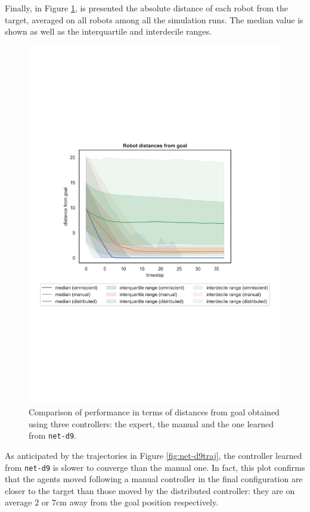 Finally, in Figure \ref{fig:net-d9distance}, is presented the absolute distance of 
each robot from the target, averaged on all robots among all the simulation runs. 
The median value is shown as well as the interquartile and interdecile ranges.
\begin{figure}[!htb]
	\centering
	\includegraphics[width=.63\textwidth]{contents/images/net-d9/distances-from-goal-compressed-distributed}%
	\caption[Evaluation of \texttt{net-d9} distances from goal.]{Comparison of 
		performance in terms of distances from goal obtained using three 
		controllers: the expert, the manual and the one learned from \texttt{net-d9}.}
	\label{fig:net-d9distance}
\end{figure}
As anticipated by the trajectories in Figure \ref{fig:net-d9traj}, the controller 
learned from \texttt{net-d9} is slower to converge than the manual one. In fact, 
this plot confirms that the agents moved following a manual controller in the final 
configuration are closer to the target than those moved by the distributed 
controller: they are on average $2$ or $7$\gls{cm} away from the goal position 
respectively.

